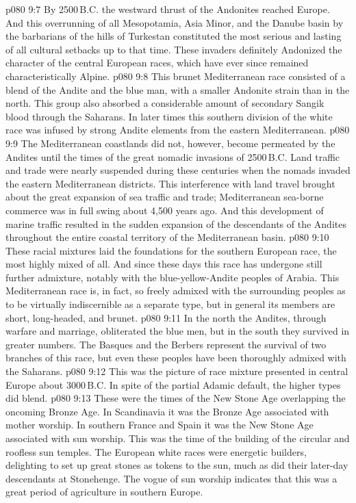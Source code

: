 \vs p080 9:7 By 2500\,B.C. the westward thrust of the Andonites reached Europe. And this overrunning of all Mesopotamia, Asia Minor, and the Danube basin by the barbarians of the hills of Turkestan constituted the most serious and lasting of all cultural setbacks up to that time. These invaders definitely Andonized the character of the central European races, which have ever since remained characteristically Alpine.
\vs p080 9:8 \bibnobreakspace {} This brunet Mediterranean race consisted of a blend of the Andite and the blue man, with a smaller Andonite strain than in the north. This group also absorbed a considerable amount of secondary Sangik blood through the Saharans. In later times this southern division of the white race was infused by strong Andite elements from the eastern Mediterranean.
\vs p080 9:9 The Mediterranean coastlands did not, however, become permeated by the Andites until the times of the great nomadic invasions of 2500\,B.C. Land traffic and trade were nearly suspended during these centuries when the nomads invaded the eastern Mediterranean districts. This interference with land travel brought about the great expansion of sea traffic and trade; Mediterranean sea\hyp{}borne commerce was in full swing about 4,500 years ago. And this development of marine traffic resulted in the sudden expansion of the descendants of the Andites throughout the entire coastal territory of the Mediterranean basin.
\vs p080 9:10 These racial mixtures laid the foundations for the southern European race, the most highly mixed of all. And since these days this race has undergone still further admixture, notably with the blue\hyp{}yellow\hyp{}Andite peoples of Arabia. This Mediterranean race is, in fact, so freely admixed with the surrounding peoples as to be virtually indiscernible as a separate type, but in general its members are short, long\hyp{}headed, and brunet.
\vs p080 9:11 In the north the Andites, through warfare and marriage, obliterated the blue men, but in the south they survived in greater numbers. The Basques and the Berbers represent the survival of two branches of this race, but even these peoples have been thoroughly admixed with the Saharans.
\vs p080 9:12 \pc This was the picture of race mixture presented in central Europe about 3000\,B.C. In spite of the partial Adamic default, the higher types did blend.
\vs p080 9:13 \pc These were the times of the New Stone Age overlapping the oncoming Bronze Age. In Scandinavia it was the Bronze Age associated with mother worship. In southern France and Spain it was the New Stone Age associated with sun worship. This was the time of the building of the circular and roofless sun temples. The European white races were energetic builders, delighting to set up great stones as tokens to the sun, much as did their later\hyp{}day descendants at Stonehenge. The vogue of sun worship indicates that this was a great period of agriculture in southern Europe.
